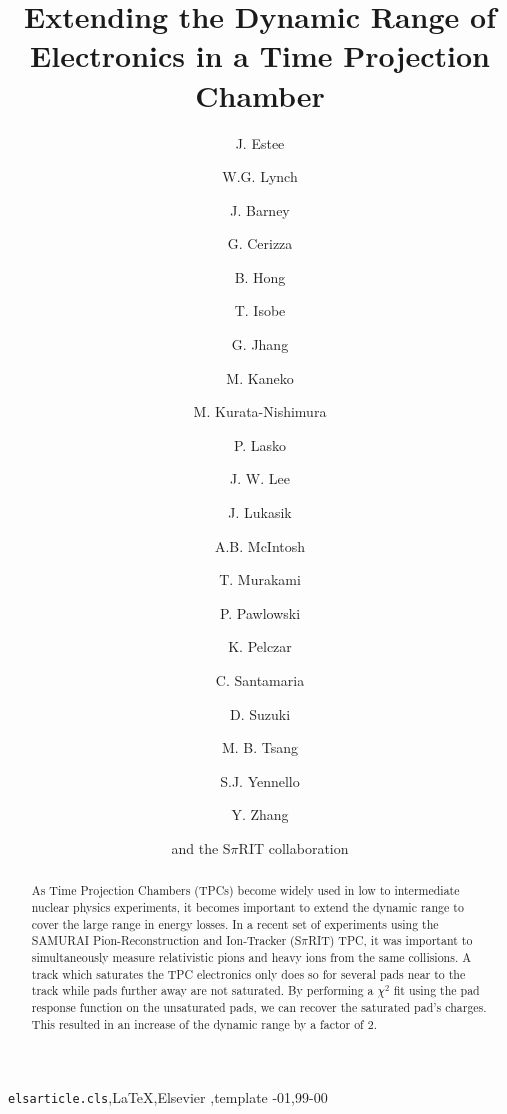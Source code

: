 \documentclass[review]{elsarticle}
\begin{document}
\begin{frontmatter}

\title{Extending the Dynamic Range of Electronics in a Time Projection Chamber}


\author[msu,nscl]{J. Estee}
\author[msu,nscl]{W.G. Lynch}
\author[msu,nscl]{J. Barney}
\author[msu,nscl]{G. Cerizza}
\author[kor]{B. Hong}
\author[riken]{T. Isobe}
\author[nscl]{G. Jhang}
\author[kyoto]{M. Kaneko}
\author[riken]{M. Kurata-Nishimura}
\author[krakow]{P. Lasko}
\author[kor]{J. W. Lee}
\author[krakow]{J. Lukasik}
\author[a&m]{A.B. McIntosh}
\author[kyoto]{T. Murakami}
\author[krakow]{P. Pawlowski}
\author[poland]{K. Pelczar}
\author[nscl]{C. Santamaria}
\author[riken]{D. Suzuki}
\author[nscl]{M. B. Tsang}
\author[a&m]{S.J. Yennello}
\author[tsing]{Y. Zhang}
\author[]{and the S$\pi$RIT collaboration}

\address[msu]{Michigan State University, Dept. Physics and Astronomy }
\address[nscl]{National Superconducting Cyclotron Laboratory}
\address[kor]{Department of Physics, Korea University}
\address[riken]{RIKEN Nishina Center}
\address[kyoto]{Department of Physics, Kyoto University}
\address[krakow]{IFJ PAN, Krak\'{o}w}
\address[a&m]{Dept. of Physics and Astronomy, Texas A$\&$M University}
\address[tsing]{Department of Physics, Tsinghua University}
\address[poland]{Faculty of Physics, Astronomy and Applied Computer Science, Jagiellonian University}



\begin{abstract}
As Time Projection Chambers (TPCs) become widely used in low to intermediate nuclear physics experiments,  it becomes important to extend the dynamic range to cover  the large range in energy losses. In a recent set of experiments using the SAMURAI Pion-Reconstruction and Ion-Tracker (S$\pi$RIT) TPC, it was important to simultaneously measure relativistic pions and heavy ions from the same collisions. A track which saturates the TPC electronics only does so for several pads near to the track while pads further away are not saturated. By performing a $\chi^2$ fit using the pad response function on the unsaturated pads, we can recover the saturated pad's charges. This resulted in an increase of the dynamic range by a factor of 2. 
\end{abstract}

\begin{keyword}
\texttt{elsarticle.cls}\sep \LaTeX\sep Elsevier \sep template
-01\sep  99-00
\end{keyword}

\end{frontmatter}
\end{document}
